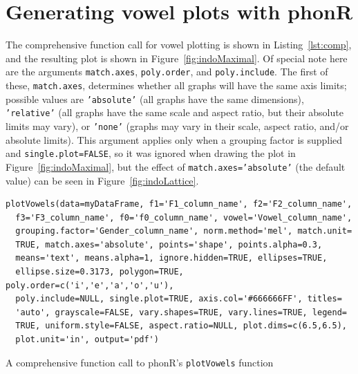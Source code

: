 \documentclass[12pt,oneside]{article}
\begin{document}
\section{Generating vowel plots with phonR}
The comprehensive function call for vowel plotting is shown in Listing~\ref{lst:comp}, and the resulting plot is shown in Figure~\ref{fig:indoMaximal}.  Of special note here are the arguments \texttt{match.axes}, \texttt{poly.order}, and \texttt{poly.include}.  The first of these, \texttt{match.axes}, determines whether all graphs will have the same axis limits; possible values are \texttt{'absolute'} (all graphs have the same dimensions), \texttt{'relative'} (all graphs have the same scale and aspect ratio, but their absolute limits may vary), or \texttt{'none'} (graphs may vary in their scale, aspect ratio, and/or absolute limits).  This argument applies only when a grouping factor is supplied and \texttt{single.plot=FALSE}, so it was ignored when drawing the plot in Figure~\ref{fig:indoMaximal}, but the effect of \texttt{match.axes='absolute'} (the default value) can be seen in Figure~\ref{fig:indoLattice}.  

\begin{listing}[bth]
\begin{verbatim}
plotVowels(data=myDataFrame, f1='F1_column_name', f2='F2_column_name', 
  f3='F3_column_name', f0='f0_column_name', vowel='Vowel_column_name', 
  grouping.factor='Gender_column_name', norm.method='mel', match.unit=
  TRUE, match.axes='absolute', points='shape', points.alpha=0.3, 
  means='text', means.alpha=1, ignore.hidden=TRUE, ellipses=TRUE, 
  ellipse.size=0.3173, polygon=TRUE, poly.order=c('i','e','a','o','u'), 
  poly.include=NULL, single.plot=TRUE, axis.col='#666666FF', titles=
  'auto', grayscale=FALSE, vary.shapes=TRUE, vary.lines=TRUE, legend=
  TRUE, uniform.style=FALSE, aspect.ratio=NULL, plot.dims=c(6.5,6.5), 
  plot.unit='in', output='pdf')
\end{verbatim}
\caption{A comprehensive function call to phonR's \texttt{plotVowels} function}
\label{lst:comp}
\end{listing}
\end{document}
